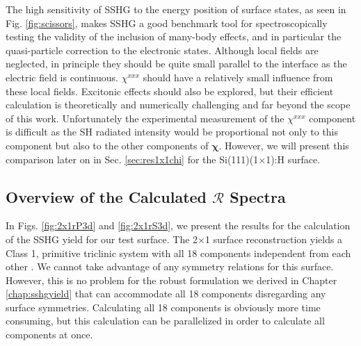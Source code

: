 The high sensitivity of SSHG to the energy position of surface states, as seen
in Fig. \ref{fig:scissors}, makes SSHG a good benchmark tool for
spectroscopically testing the validity of the inclusion of many-body effects,
and in particular the quasi-particle correction to the electronic states.
Although local fields are neglected, in principle they should be quite small
parallel to the interface as the electric field is continuous. $\chi^{xxx}$
should have a relatively small influence from these local fields. Excitonic
effects should also be explored, but their efficient calculation is
theoretically and numerically challenging \cite{beyond} and far beyond the scope
of this work. Unfortunately the experimental measurement of the $\chi^{xxx}$
component is difficult as the SH radiated intensity would be proportional not
only to this component but also to the other components of $\boldsymbol{\chi}$.
However, we will present this comparison later on in Sec. \ref{sec:res1x1chi} for
the Si(111)(1$\times$1):H surface.



\subsection{Overview of the Calculated \texorpdfstring{$\mathcal{R}$}{R}
Spectra}\label{sec:2x1R3D}

In Figs. \ref{fig:2x1rP3d} and \ref{fig:2x1rS3d}, we present the results for the
calculation of the SSHG yield for our test surface. The 2$\times$1 surface
reconstruction yields a Class 1, primitive triclinic system with all 18
components independent from each other \cite{popovbook}. We cannot take
advantage of any symmetry relations for this surface. However, this is no
problem for the robust formulation we derived in Chapter \ref{chap:sshgyield}
that can accommodate all 18 components disregarding any surface symmetries.
Calculating all 18 components is obviously more time consuming, but this
calculation can be parallelized in order to calculate all components at once.


